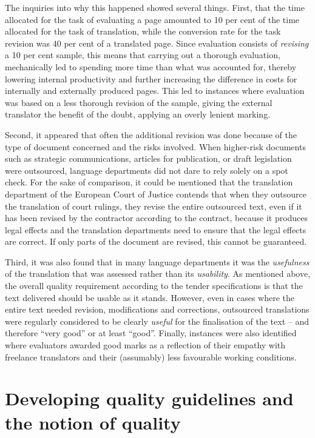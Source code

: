 \documentclass[output=paper]{langsci/langscibook}
\begin{document}
The inquiries into why this happened showed several things. First, that the time allocated for the task of evaluating a page amounted to 10 per cent of the time allocated for the task of translation, while the conversion rate for the task revision was 40 per cent of a translated page. Since evaluation consists of \textit{revising} a 10 per cent sample, this means that carrying out a thorough evaluation, mechanically led to spending more time than what was accounted for, thereby lowering internal productivity and further increasing the difference in costs for internally and externally produced pages. This led to instances where evaluation was based on a less thorough revision of the sample, giving the external translator the benefit of the doubt, applying an overly lenient marking.

Second, it appeared that often the additional revision was done because of the type of document concerned and the risks involved. When higher-risk documents such as strategic communications, articles for publication, or draft legislation were outsourced, language departments did not dare to rely solely on a spot check. For the sake of comparison, it could be mentioned that the translation department of the European Court of Justice contends that when they outsource the translation of court rulings, they revise the entire outsourced text, even if it has been revised by the contractor according to the contract, because it produces legal effects and the translation departments need to ensure that the legal effects are correct. If only parts of the document are revised, this cannot be guaranteed. 

Third, it was also found that in many language departments it was the \textit{usefulness} of the translation that was assessed rather than its \textit{usability}. As mentioned above, the overall quality requirement according to the tender specifications is that the text delivered should be usable as it stands. However, even in cases where the entire text needed revision, modifications and corrections, outsourced translations were regularly considered to be clearly \textit{useful} for the finalisation of the text – and therefore ``very good'' or at least ``good''. Finally, instances were also identified where evaluators awarded good marks as a reflection of their empathy with freelance translators and their (assumably) less favourable working conditions.

\section{Developing quality guidelines and the notion of quality}\label{sec:strandvik:strandvic:4}
\end{document}
